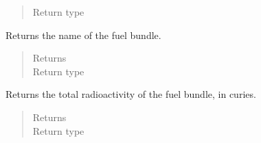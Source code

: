 \documentclass[letterpaper,10pt,openany,oneside,english]{sphinxmanual}
\begin{document}
\begin{fulllineitems}
\begin{fulllineitems}
\begin{quote}
\begin{description}
\item[{Return type}] \leavevmode
{}

\end{description}\end{quote}

\end{fulllineitems}


\begin{fulllineitems}
\label{\detokenize{support_rst/fuel_bundle:fuel_bundle.FuelBundle.name}}
Returns the name of the fuel bundle.
\begin{quote}\begin{description}
\item[{Returns}] \leavevmode
{}

\item[{Return type}] \leavevmode
{}

\end{description}\end{quote}

\end{fulllineitems}


\begin{fulllineitems}
\label{\detokenize{support_rst/fuel_bundle:fuel_bundle.FuelBundle.radioactivity}}
Returns the total radioactivity of the fuel bundle, in curies.
\begin{quote}\begin{description}
\item[{Returns}] \leavevmode
{}

\item[{Return type}] \leavevmode
{}

\end{description}\end{quote}

\end{fulllineitems}



\end{fulllineitems}
\end{document}
